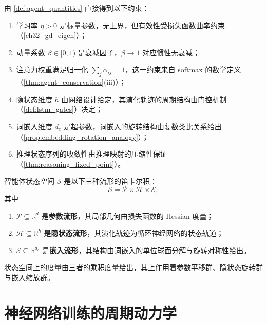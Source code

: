 \begin{property}[基本量的直接约束]\label{prop:agent_basic_constraints}
由 \cref{def:agent_quantities} 直接得到以下约束：
\begin{enumerate}[label=(\roman*)]
    \item 学习率 $\eta > 0$ 是标量参数，无上界，但有效性受损失函数曲率约束（\cref{ch32_gd_eigen}）；
    \item 动量系数 $\beta \in [0,1)$ 是衰减因子，$\beta \to 1$ 对应惯性无衰减；
    \item 注意力权重满足归一化 $\sum_j \alpha_{ij} = 1$，这一约束来自 softmax 的数学定义（\cref{thm:agent_conservation}(iii)）；
    \item 隐状态维度 $h$ 由网络设计给定，其演化轨迹的周期结构由门控机制（\cref{def:lstm_gates}）决定；
    \item 词嵌入维度 $d_e$ 是超参数，词嵌入的旋转结构由复数类比关系给出（\cref{prop:embedding_rotation_analogy}）；
    \item 推理状态序列的收敛性由推理映射的压缩性保证（\cref{thm:reasoning_fixed_point}）。
\end{enumerate}
\end{property}

\begin{definition}[智能体状态空间的流形结构]\label{def:agent_state_manifold}
智能体状态空间 $\mathcal{S}$ 是以下三种流形的笛卡尔积：
\[
\mathcal{S}=\mathcal{P}\times\mathcal{H}\times\mathcal{E},
\]
其中
\begin{enumerate}[label=(\roman*)]
    \item $\mathcal{P}\subseteq\mathbb{R}^d$ 是\textbf{参数流形}，其局部几何由损失函数的 Hessian 度量；
    \item $\mathcal{H}\subseteq\mathbb{R}^h$ 是\textbf{隐状态流形}，其演化轨迹为循环神经网络的状态轨道；
    \item $\mathcal{E}\subseteq\mathbb{R}^{d_e}$ 是\textbf{嵌入流形}，其结构由词嵌入的单位球面分解与旋转对称性给出。
\end{enumerate}
状态空间上的度量由三者的乘积度量给出，其上作用着参数平移群、隐状态旋转群与嵌入缩放群。
\end{definition}

\section{神经网络训练的周期动力学}

